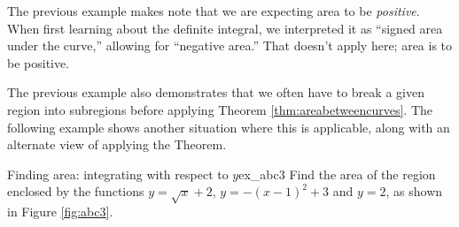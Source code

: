 The previous example makes note that we are expecting area to be \textit{positive}. When first learning about the definite integral, we interpreted it as ``signed area under the curve,'' allowing for ``negative area.'' That doesn't apply here; area is to be positive.

The previous example also demonstrates that we often have to break a given region into subregions before applying Theorem \ref{thm:areabetweencurves}. The following example shows another situation where this is applicable, along with an alternate view of applying the Theorem.\\


\begin{example}{Finding area: integrating with respect to $y$}{ex_abc3}
{
Find the area of the region enclosed by the functions $y=\sqrt{x}+2$, $y=-(x-1)^2+3$ and $y=2$, as shown in Figure \ref{fig:abc3}.}
\end{example}



